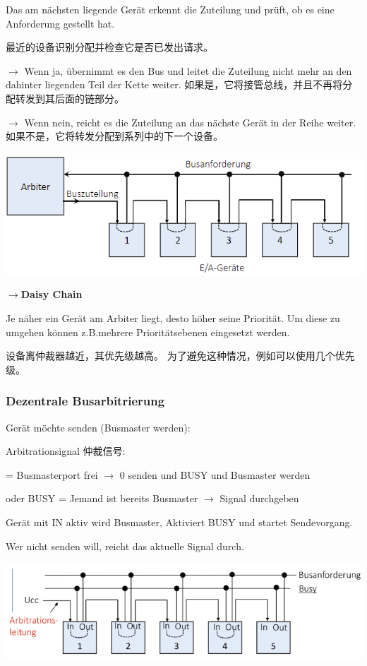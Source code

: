 \documentclass[fleqn]{article}
\begin{document}
Das am nächsten liegende Gerät erkennt die Zuteilung und prüft, ob es eine Anforderung gestellt hat.

最近的设备识别分配并检查它是否已发出请求。

$\rightarrow$ Wenn ja, übernimmt es den Bus und leitet die Zuteilung nicht mehr an den dahinter liegenden Teil der Kette weiter.
如果是，它将接管总线，并且不再将分配转发到其后面的链部分。

$\rightarrow$ Wenn nein, reicht es die Zuteilung an das nächste Gerät in der Reihe weiter.
如果不是，它将转发分配到系列中的下一个设备。

\begin{center}
    \includegraphics[scale=0.6]{15.png}
\end{center}

$\rightarrow$\textbf{Daisy Chain} 

Je näher ein Gerät am Arbiter liegt, desto höher seine Priorität. Um diese zu umgehen können z.B.mehrere Prioritätsebenen eingesetzt werden.

设备离仲裁器越近，其优先级越高。 为了避免这种情况，例如可以使用几个优先级。

\subsubsection{Dezentrale Busarbitrierung}

Gerät möchte senden (Busmaster werden):

Arbitrationsignal 仲裁信号:

\indent{} = Busmasterport frei $\rightarrow$ 0 senden und BUSY und Busmaster werden

\indent{} oder BUSY = Jemand ist bereits Busmaster $\rightarrow$ Signal durchgeben

Gerät mit IN aktiv wird Busmaster, Aktiviert BUSY und startet Sendevorgang.

Wer nicht senden will, reicht das aktuelle Signal durch.

\begin{center}
    \includegraphics[scale=0.5]{16.png}
\end{center}
\end{document}
